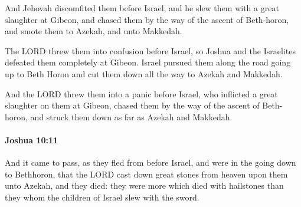 			\begin{versebox}
					\item[BHS] 
					\item[ASV] And Jehovah discomfited them before Israel, and he slew them with a great slaughter at Gibeon, and chased them by the way of the ascent of Beth-horon, and smote them to Azekah, and unto Makkedah.
					\item[NIV] The LORD threw them into confusion before Israel, so Joshua and the Israelites defeated them completely at Gibeon. Israel pursued them along the road going up to Beth Horon and cut them down all the way to Azekah and Makkedah.
					\item[NRSV] And the LORD threw them into a panic before Israel, who inflicted a great slaughter on them at Gibeon, chased them by the way of the ascent of Beth-horon, and struck them down as far as Azekah and Makkedah.
			\end{versebox}

		\paragraph{Joshua 10:11} %
			\label{JOSHUA-10-11}

			And it came to pass, as they fled from before Israel, and were in the going down to Bethhoron, that the LORD cast down great stones from heaven upon them unto Azekah, and they died: they were more which died with hailstones than they whom the children of Israel slew with the sword.


